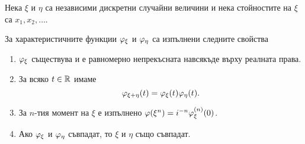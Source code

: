\documentclass[numbers=endperiod, DIV=15, bibliography=totocnumbered]{scrartcl}
\begin{document}
\begin{theorem}
  Нека $\xi$ и $\eta$ са независими дискретни случайни величини и нека стойностите на $\xi$ са $x_1, x_2, \ldots$.

  За характеристичните функции $\varphi_\xi$ и $\varphi_\eta$ са изпълнени следните свойства
  \begin{enumerate}
    \item $\varphi_\xi$ съществува и е равномерно непрекъсната навсякъде върху реалната права.

    \item За всяко $t \in \mathbb{R}$ имаме
    \begin{displaymath}
      \varphi_{\xi + \eta}(t) = \varphi_\xi(t) \varphi_\eta(t).
    \end{displaymath}

    \item За $n$-тия момент на $\xi$ е изпълнено $\varphi(\xi^n) = i^{-n} \varphi_\xi^{(n)} (0)$.

    \item Ако $\varphi_\xi$ и $\varphi_\eta$ съвпадат, то $\xi$ и $\eta$ също съвпадат.
  \end{enumerate}
\end{theorem}
\end{document}
